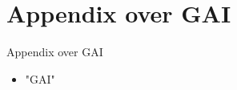 \documentclass{beamer}
\begin{document}
\section{Appendix over GAI}
\begin{frame}{Appendix over GAI}
    \begin{itemize}
        \item "GAI"
    \end{itemize}
\end{frame}
\end{document}
